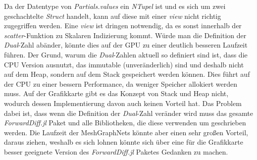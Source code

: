 Da der Datentype von \textit{Partials.values} ein \textit{NTupel} ist und es sich um zwei geschachtelte 
\textit{Struct} handelt, kann auf diese mit einer \textit{view} nicht richtig zugegriffen werden.
Eine \textit{view} ist dringen notwendig, da es sonst innerhalb der \textit{scatter}-Funktion 
zu Skalaren Indizierung kommt.
Würde man die Definition der \textit{Dual}-Zahl abänder, könnte dies auf der 
GPU zu einer deutlich besseren Laufzeit führen.
Der Grund, warum die \textit{Dual}-Zahlen aktuell so definiert sind ist,
dass die CPU Version ausnutzt, das  immutable (unveränderlich) sind und deshalb
nicht auf dem Heap, sondern auf dem Stack gespeichert werden können.
Dies führt auf der CPU zu einer bessern Performance, da weniger Speicher allokiert
werden muss.
Auf der Grafikkarte gibt es das Konzept von Stack und Heap nicht, wodurch dessen Implementierung
davon auch keinen Vorteil hat.
Das Problem dabei ist, dass wenn die Definition der \textit{Dual}-Zahl veränder wird
muss das gesamte \textit{ForwardDiff.jl} Paket und alle Bibliotheken, die diese verwenden
um geschrieben werden.
Die Laufzeit der MeshGraphNets könnte aber einen sehr großen Vorteil, daraus ziehen, weshalb 
es sich lohnen könnte sich über eine für die Grafikkarte besser geeignete Version des 
\textit{ForwardDiff.jl} Paketes Gedanken zu machen.









